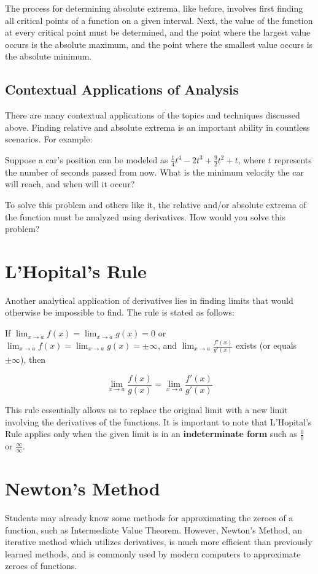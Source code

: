 \documentclass[11pt]{article}
\begin{document}
The process for determining absolute extrema, like before, involves first finding all critical points of a function on a given interval. Next, the value of the function at every critical point must be determined, and the point where the largest value occurs is the absolute maximum, and the point where the smallest value occurs is the absolute minimum.

\subsection{Contextual Applications of Analysis}
There are many contextual applications of the topics and techniques discussed above. Finding relative and absolute extrema is an important ability in countless scenarios. For example:

Suppose a car's position can be modeled as $\frac{1}{4}t^4-2t^3+\frac{9}{2}t^2+t$, where $t$ represents the number of seconds passed from now. What is the minimum velocity the car will reach, and when will it occur?

To solve this problem and others like it, the relative and/or absolute extrema of the function must be analyzed using derivatives. How would you solve this problem?

\section{L'Hopital's Rule}
Another analytical application of derivatives lies in finding limits that would otherwise be impossible to find. The rule is stated as follows: 

If $\lim_{x \to a} f(x) = \lim_{x \to a} g(x) = 0$ or $\lim_{x \to a} f(x) = \lim_{x \to a} g(x) = \pm \infty$, and $\lim_{x \to a} \frac{f'(x)}{g'(x)}$ exists (or equals $\pm \infty$), then

\[\lim_{x \to a} \frac{f(x)}{g(x)} = \lim_{x \to a} \frac{f'(x)}{g'(x)}\]

This rule essentially allows us to replace the original limit with a new limit involving the derivatives of the functions. It is important to note that L'Hopital's Rule applies only when the given limit is in an \textbf{indeterminate form} such as $\frac{0}{0}$ or $\frac{\infty}{\infty}$.

\section{Newton's Method}
Students may already know some methods for approximating the zeroes of a function, such as Intermediate Value Theorem. However, Newton's Method, an iterative method which utilizes derivatives, is much more efficient than previously learned methods, and is commonly used by modern computers to approximate zeroes of functions.
\end{document}

